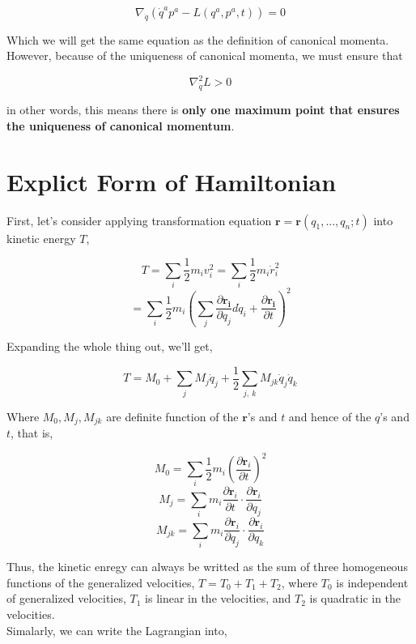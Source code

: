 \documentclass[12pt]{article}
\begin{document}
\begin{center}
    \[ \nabla_{\dot{q}} \left( \dot{q}^ap^a - L(q^a, p^a, t) \right) = 0 \]
\end{center}

Which we will get the same equation as the definition of canonical momenta. However, because of the uniqueness of canonical momenta, we must ensure that

\begin{center}
    \[ \nabla_{\dot{q}}^2 L > 0 \]
\end{center}

in other words, this means there is \textbf{only one maximum point that ensures the uniqueness of canonical momentum}.

\section{Explict Form of Hamiltonian}
First, let's consider applying transformation equation $\mathbf{r} = \mathbf{r}(q_1, ..., q_n; t)$ into kinetic energy $T$,

\begin{center}
    \[ T = \sum_i{\frac{1}{2}m_i v_{i}^2 = \sum_i{\frac{1}{2} m_i \dot{r}_{i}^2}} \]
    \[ = \sum_i{\frac{1}{2} m_i \left( \sum_j{ \frac{\partial \mathbf{r_i}}{\partial q_j}d\dot{q}_i + \frac{\partial \mathbf{r_i}}{\partial t} }\right)^2} \]
\end{center}

Expanding the whole thing out, we'll get,

\begin{center}
    \[ T = M_0 + \sum_{j}{M_j\dot{q}_j} + \frac{1}{2}\sum_{j,\ k}{M_{jk}\dot{q}_j\dot{q}_k} \]
\end{center}

Where $M_0, M_j, M_{jk}$ are definite function of the $\mathbf{r}$'s and $t$ and hence of the $q$'s and $t$, that is, 

\begin{center}
    \[ M_0 = \sum_{i}{\frac{1}{2}m_i\left(\frac{\partial \mathbf{r}_i}{\partial t}\right)^2} \]
    \[ M_j = \sum_{i}{m_i \frac{\partial \mathbf{r}_i}{\partial t} \cdot \frac{\partial \mathbf{r}_i}{\partial q_j}} \]
    \[ M_{jk} = \sum_{i}{m_i \frac{\partial \mathbf{r}_i}{\partial q_j} \cdot \frac{\partial \mathbf{r}_i}{\partial q_k}} \] 
\end{center}

Thus, the kinetic enregy can always be writted as the sum of three homogeneous functions of the generalized velocities, $T = T_0 + T_1 + T_2$, where $T_0$ is independent of generalized velocities, $T_1$ is linear in the velocities, and $T_2$ is quadratic in the velocities.
\\
Simalarly, we can write the Lagrangian into,
\end{document}
